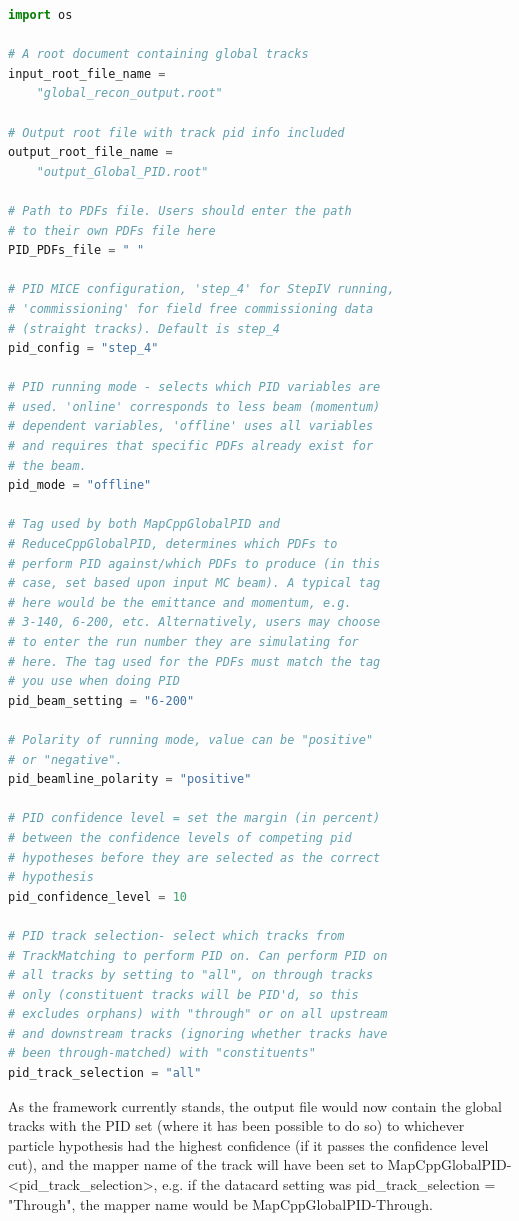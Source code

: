 \begin{lstlisting}[language=Python,basicstyle=\ttfamily,breaklines=true,frame=single,captionpos=b,caption={An example datacard (example\_pid\_datacard.py) for use with GlobalPID.py},label=piddatacard]
import os

# A root document containing global tracks
input_root_file_name = 
	"global_recon_output.root"

# Output root file with track pid info included
output_root_file_name = 
	"output_Global_PID.root"

# Path to PDFs file. Users should enter the path
# to their own PDFs file here
PID_PDFs_file = " "

# PID MICE configuration, 'step_4' for StepIV running,
# 'commissioning' for field free commissioning data
# (straight tracks). Default is step_4
pid_config = "step_4"

# PID running mode - selects which PID variables are
# used. 'online' corresponds to less beam (momentum)
# dependent variables, 'offline' uses all variables 
# and requires that specific PDFs already exist for
# the beam.
pid_mode = "offline"

# Tag used by both MapCppGlobalPID and
# ReduceCppGlobalPID, determines which PDFs to
# perform PID against/which PDFs to produce (in this
# case, set based upon input MC beam). A typical tag
# here would be the emittance and momentum, e.g.
# 3-140, 6-200, etc. Alternatively, users may choose
# to enter the run number they are simulating for
# here. The tag used for the PDFs must match the tag
# you use when doing PID
pid_beam_setting = "6-200"

# Polarity of running mode, value can be "positive"
# or "negative".
pid_beamline_polarity = "positive"

# PID confidence level = set the margin (in percent)
# between the confidence levels of competing pid
# hypotheses before they are selected as the correct
# hypothesis
pid_confidence_level = 10

# PID track selection- select which tracks from
# TrackMatching to perform PID on. Can perform PID on
# all tracks by setting to "all", on through tracks
# only (constituent tracks will be PID'd, so this
# excludes orphans) with "through" or on all upstream
# and downstream tracks (ignoring whether tracks have
# been through-matched) with "constituents"
pid_track_selection = "all"

\end{lstlisting}

As the framework currently stands, the output file would now contain the global tracks with the PID set (where it has been possible to do so) to whichever particle hypothesis had the highest confidence (if it passes the confidence level cut), and the mapper name of the track will have been set to MapCppGlobalPID-<pid\_track\_selection>, e.g. if the datacard setting was pid\_track\_selection = "Through", the mapper name would be MapCppGlobalPID-Through.

